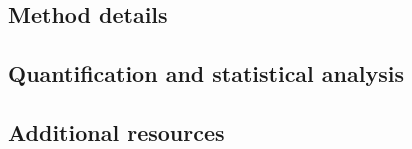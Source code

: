 \documentclass[12pt,letterpaper]{article}
\begin{document}

\subsection*{Method details}


\subsection*{Quantification and statistical analysis}


\subsection*{Additional resources}

\end{document}
